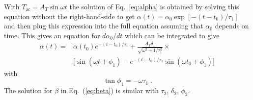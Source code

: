 \documentclass[pre,a4paper,twocolumn,superscriptaddress,%
floatfix]{revtex4}
\newcommand{\tac}{\ensuremath{T_{\mathrm{ac}}}}
\begin{document}
With $\tac = A_T \sin \omega t$ the solution of Eq.~\ref{eq:alpha} is obtained
by solving this equation without the right-hand-side to get $\alpha(t) =
\alpha_0 \exp[-(t-t_0)/\tau_1]$ and then plug this expression
into the full equation
assuming that $\alpha_0$ depends on time. This gives an equation for $d
\alpha_0/dt$ which can be integrated to give
\begin{align}
  \label{eq:solalpha1}
  \alpha(t) = & \alpha(t_0) e^{-(t-t_0)/\tau_1} + \frac{A_T
                \delta_1}{\sqrt{\omega^2 + 1/\tau_1^2}} \times
                \nonumber \\
  &\Big[ \sin(\omega t + \phi_1)
  - e^{-(t-t_0)/\tau_1} \sin(\omega t_0 + \phi_1) \Big] \,
\end{align}
with
\begin{equation}
  \label{eq:phi1}
  \tan \phi_1 = - \omega \tau_1 \; .
\end{equation}
The solution for $\beta$ in
Eq.~(\ref{eq:beta}) is similar with $\tau_2$, $\delta_2$,
$\phi_2$.
\end{document}
